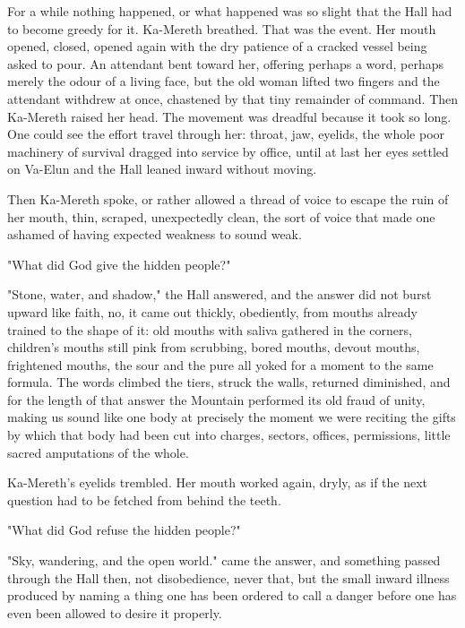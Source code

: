 For a while nothing happened, or what happened was so slight that the Hall had to become greedy for it. 
Ka-Mereth breathed. 
That was the event. 
Her mouth opened, closed, opened again with the dry patience of a cracked vessel being asked to pour. 
An attendant bent toward her, offering perhaps a word, perhaps merely the odour of a living face, but the old woman lifted two fingers and the attendant withdrew at once, 
chastened by that tiny remainder of command. 
Then Ka-Mereth raised her head. 
The movement was dreadful because it took so long. 
One could see the effort travel through her: throat, jaw, eyelids, the whole poor machinery of survival dragged into service by office, 
until at last her eyes settled on Va-Elun and the Hall leaned inward without moving.\par


Then Ka-Mereth spoke, or rather allowed a thread of voice to escape the ruin of her mouth, thin, scraped, unexpectedly clean, 
the sort of voice that made one ashamed of having expected weakness to sound weak. \par

"What did God give the hidden people?"\par

"Stone, water, and shadow," the Hall answered, and the answer did not burst upward like faith, no, it came out thickly, obediently, 
from mouths already trained to the shape of it: old mouths with saliva gathered in the corners, children’s mouths still pink from scrubbing, 
bored mouths, devout mouths, frightened mouths, the sour and the pure all yoked for a moment to the same formula. The words climbed the tiers, 
struck the walls, returned diminished, and for the length of that answer the Mountain performed its old fraud of unity, making us sound like 
one body at precisely the moment we were reciting the gifts by which that body had been cut into charges, sectors, offices, permissions, 
little sacred amputations of the whole.\par

Ka-Mereth’s eyelids trembled. 
Her mouth worked again, dryly, as if the next question had to be fetched from behind the teeth. 

"What did God refuse the hidden people?"\par

"Sky, wandering, and the open world." came the answer, and something passed through the Hall then, not disobedience, 
never that, but the small inward illness produced by naming a thing one has been ordered to call a danger before one 
has even been allowed to desire it properly. 

